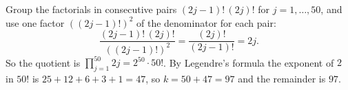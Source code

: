 Group the factorials in consecutive pairs $(2j-1)!\,(2j)!$ for $j=1,\dots,50$, and use one factor $\left((2j-1)!\right)^2$ of the denominator for each pair:
\[
\dfrac{(2j-1)!\,(2j)!}{\left((2j-1)!\right)^2}=\dfrac{(2j)!}{(2j-1)!}=2j .
\]
So the quotient is $\displaystyle\prod_{j=1}^{50}2j=2^{50}\cdot50!$. By Legendre's formula the exponent of $2$ in $50!$ is $25+12+6+3+1=47$, so $k=50+47=97$ and the remainder is $\boxed{97}$.
